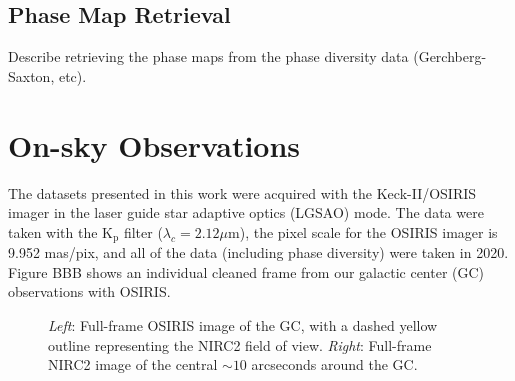 \documentclass[]{spie}  %
\begin{document}
\subsection{Phase Map Retrieval} \label{subsec:phase-map-retrieval}
Describe retrieving the phase maps from the phase diversity data (Gerchberg-Saxton, etc).

\section{On-sky Observations}\label{sec:on-sky-obs}
The datasets presented in this work were acquired with the Keck-II/OSIRIS imager in the laser guide star adaptive optics (LGSAO) mode. The data were taken with the K$_{\textrm{p}}$ filter ($\lambda_{c} = 2.12\mu$m), the pixel scale for the OSIRIS imager is 9.952 mas/pix, and all of the data (including phase diversity) were taken in 2020. Figure BBB shows an individual cleaned frame from our galactic center (GC) observations with OSIRIS.

\begin{figure}[!h]
  \hspace{-20mm}
  \caption{\footnotesize \textit{Left}: Full-frame OSIRIS image of the GC, with a dashed yellow outline representing the NIRC2 field of view. \textit{Right}: Full-frame NIRC2 image of the central ${\sim}10$ arcseconds around the GC.} \label{fig:gc_osiris_nirc2}
\end{figure}


\listoffigures
\end{document}
